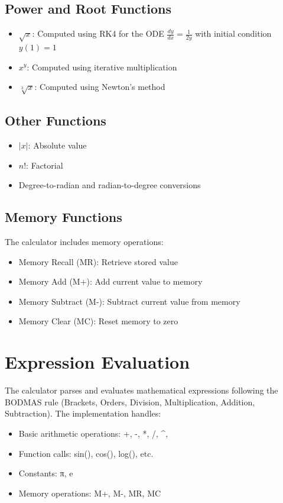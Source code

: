 \documentclass[12pt,a4paper]{article}
\begin{document}
\subsection{Power and Root Functions}
\begin{itemize}
    \item $\sqrt{x}$: Computed using RK4 for the ODE $\frac{dy}{dx} = \frac{1}{2y}$ with initial condition $y(1) = 1$
    \item $x^y$: Computed using iterative multiplication
    \item $\sqrt[3]{x}$: Computed using Newton's method
\end{itemize}

\subsection{Other Functions}
\begin{itemize}
    \item $|x|$: Absolute value
    \item $n!$: Factorial
    \item Degree-to-radian and radian-to-degree conversions
\end{itemize}

\subsection{Memory Functions}
The calculator includes memory operations:
\begin{itemize}
    \item Memory Recall (MR): Retrieve stored value
    \item Memory Add (M+): Add current value to memory
    \item Memory Subtract (M-): Subtract current value from memory
    \item Memory Clear (MC): Reset memory to zero
\end{itemize}

\section{Expression Evaluation}
The calculator parses and evaluates mathematical expressions following the BODMAS rule (Brackets, Orders, Division, Multiplication, Addition, Subtraction). The implementation handles:

\begin{itemize}
    \item Basic arithmetic operations: +, -, *, /, ^, %
    \item Function calls: sin(), cos(), log(), etc.
    \item Constants: π, e
    \item Memory operations: M+, M-, MR, MC
\end{itemize}
\end{document}

